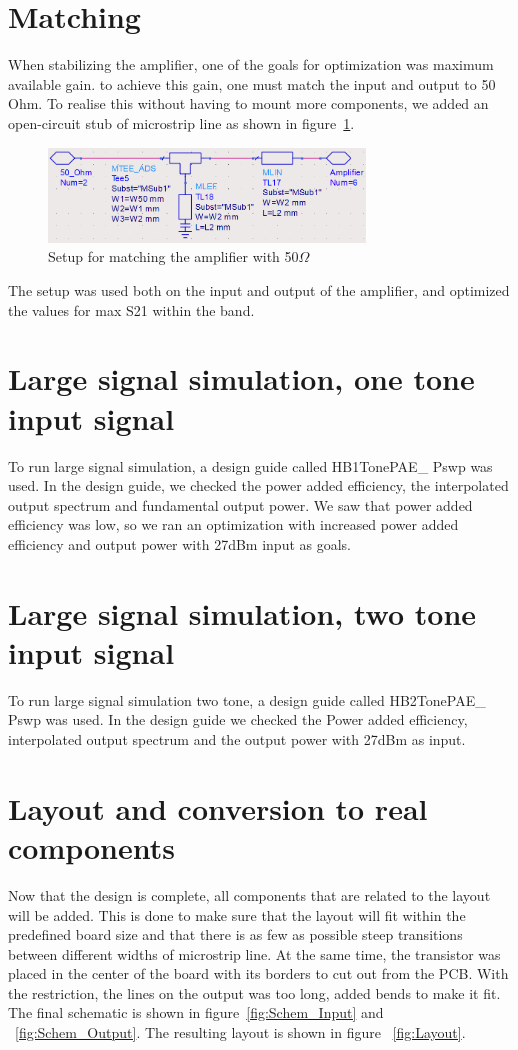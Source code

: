   \section{Matching}
  When stabilizing the amplifier, one of the goals for optimization was maximum available gain. to achieve this gain, one must match the input and output to 50 Ohm. To realise this without having to mount more components, we added an open-circuit stub of microstrip line as shown in figure~\ref{fig:fig_match_net}.
  \begin{figure}[h]
	\centering
	\includegraphics[width=0.75\textwidth]{img/Matching_network}
	\caption{Setup for matching the amplifier with 50$\Omega$}
	\label{fig:fig_match_net}
  \end{figure}
  The setup was used both on the input and output of the amplifier, and optimized the values for max S21 within the band.
  
  \section{Large signal simulation, one tone input signal}
  To run large signal simulation, a design guide called HB1TonePAE\_ Pswp was used. In the design guide, we checked the power added efficiency, the interpolated output spectrum and fundamental output power. We saw that power added efficiency was low, so we ran an optimization with increased power added efficiency and output power with 27dBm input as goals.
  
  \section{Large signal simulation, two tone input signal}
  To run large signal simulation two tone, a design guide called HB2TonePAE\_ Pswp was used. In the design guide we checked the Power added efficiency, interpolated output spectrum and the output power with 27dBm as input. 
  \section{Layout and conversion to real components}
  Now that the design is complete, all components that are related to the layout will be added. This is done to make sure that the layout will fit within the predefined board size and that there is as few as possible steep transitions between different widths of microstrip line. At the same time, the transistor was placed in the center of the board with its borders to cut out from the PCB. With the restriction, the lines on the output was too long, added bends to make it fit. The final schematic is shown in figure~\ref{fig:Schem_Input} and ~\ref{fig:Schem_Output}. The resulting layout is shown in figure ~\ref{fig:Layout}.
